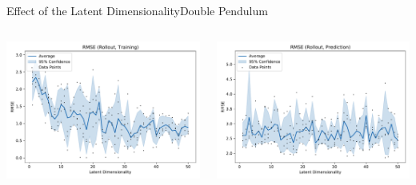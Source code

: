 \documentclass[
	aspectratio=43,
	color={accentcolor=1c},
	logo=false,
	colorframetitle=true,
	handout
]{tudabeamer}
\begin{document}
			\begin{frame}[c]{Effect of the Latent Dimensionality}{Double Pendulum}
				\begin{columns}[c]
					\begin{column}{0.5\linewidth}
						\begin{center}
							\includegraphics[width=\linewidth]{figures/experiments/acrobot-gym/latent-dim/comparison-rmse-rollout-train-mean-vs-latent-dim.pdf}
						\end{center}
					\end{column}
					\begin{column}{0.5\linewidth}
						\begin{center}
							\includegraphics[width=\linewidth]{figures/experiments/acrobot-gym/latent-dim/comparison-rmse-rollout-prediction-mean-vs-latent-dim.pdf}
						\end{center}
					\end{column}
				\end{columns}
			\end{frame}
\end{document}
